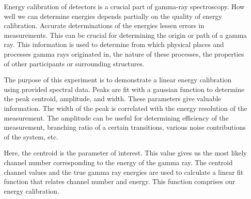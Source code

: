 
Energy calibration of detectors is a crucial part of gamma-ray spectroscopy. How well we can determine energies depends partially on the quality of energy calibration. Accurate determinations of the energies lessen errors in measurements. This can be crucial for determining the origin or path of a gamma ray. This information is used to determine from which physical places and processes gamma rays originated in, the nature of these processes, the properties of other participants or surrounding structures.

The purpose of this experiment is to demonstrate a linear energy calibration using provided spectral data. Peaks are fit with a gaussian function to determine the peak centroid, amplitude, and width. These parameters give valuable information. The width of the peak is correlated with the energy resolution of the measurement. The amplitude can be useful for determining efficiency of the measurement, branching ratio of a certain transitions, various noise contributions of the system, etc.\cite{Knoll:1300754}

Here, the centroid is the parameter of interest. This value gives us the most likely channel number corresponding to the energy of the gamma ray. The centroid channel values and the true gamma ray energies are used to calculate a linear fit function that relates channel number and energy. This function comprises our energy calibration.
